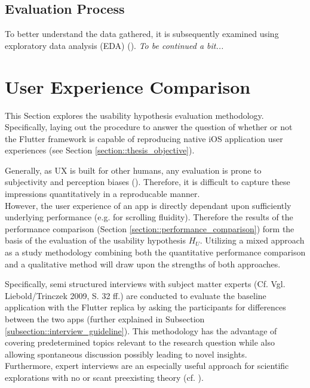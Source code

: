 \subsection{Evaluation Process} \label{subsection::evaluation_process}
To better understand the data gathered, it is subsequently examined using exploratory data
analysis (EDA) (\cite{Tukey1977}). \textit{To be continued a bit...}


\section{User Experience Comparison} \label{section::usability_comparison_design}
This Section explores the usability hypothesis evaluation methodology. Specifically, laying out
the procedure to answer the question of whether or not the Flutter framework is capable of
reproducing native iOS application user experiences (see Section \ref{section::thesis_objective}).

Generally, as UX is built for other humans, any evaluation is prone to subjectivity and perception
biases (\cite{Tversky1974}). Therefore, it is difficult to capture these impressions quantitatively in a reproducable manner.\\
However, the user experience of an app is directly dependant upon sufficiently underlying performance (e.g. for scrolling
fluidity). Therefore the results of the performance comparison (Section \ref{section::performance_comparison}) form the basis of the evaluation of the usability hypothesis $H_U$.
Utilizing a mixed approach as a study methodology combining both the quantitative performance comparison and a qualitative method will draw upon the strengths of both approaches. 

Specifically, semi structured interviews with subject matter experts (Cf. Vgl. Liebold/Trinczek 2009, S. 32 ff.) are conducted to evaluate the baseline application
with the Flutter replica by asking the participants for differences between the two apps (further explained in Subsection \ref{subsection::interview_guideline}). This methodology has the
advantage of covering predetermined topics relevant to the research question while also allowing spontaneous discussion possibly leading to novel insights.\\
Furthermore, expert interviews are an especially useful approach for scientific explorations
with no or scant preexisting theory (cf. \cite{Experts2009}).

